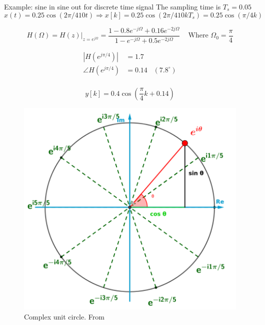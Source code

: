 \newpage
\begin{exampleblock}{Example: sine in sine out for discrete time signal}
    The sampling time is $T_s = 0.05$ 
    \begin{equation*}
        x(t) = 0.25\cos(2\pi/4 10 t) \Rightarrow x[k] = 0.25\cos(2\pi/4 10 k T_s) = 0.25\cos(\pi/4 k)
    \end{equation*}

    \begin{equation*}
        H(\Omega) = H(z)|_{z=e^{j\Omega}} = \frac{ 1 -0.8e^{-j\Omega} +0.16e^{-2j\Omega} }{ 1 -e^{-j\Omega} +0.5e^{-2j\Omega} } \;\;\; \text{ Where } \Omega_0 = \frac{\pi}{4}
    \end{equation*}

    \begin{align*}
        |H(e^{j\pi/4})| &= 1.7  \\
        \angle H(e^{j\pi/4}) &= 0.14 \;\;\; (7.8^{\circ}) \\
    \end{align*}

    \begin{equation*}
        y[k] = 0.4\cos(\frac{\pi}{4}k + 0.14)
    \end{equation*}
\end{exampleblock}
    


\newpage
\begin{appendices}

\begin{figure}[!ht]
   \centering
   \includegraphics[width=12cm]{image/complex_unit_circle.png} 
   \caption{Complex unit circle. From \cite{}}
   \label{fig:complex_unit_circle}
\end{figure}
\end{appendices}
